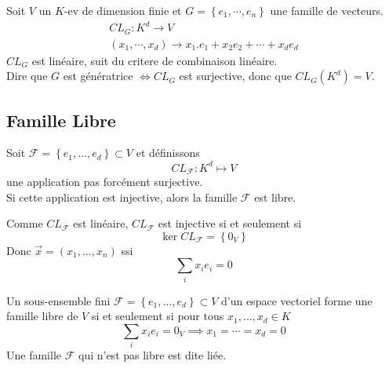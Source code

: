 \documentclass[../main.tex]{subfiles}
\begin{document}
Soit $V$ un $K$-ev de dimension finie et $G= \left\{ e_1, \cdots, e_n \right\} $ une famille de vecteurs.
\begin{align*}
CL_G: K ^{d} \to V\\
( x_1, \cdots, x_d)  \to x_1.e_1+x_2e_2+\cdots + x_d e_d
\end{align*}
$CL_G$ est linéaire, suit du critere de combinaison linéaire.\\
Dire que $G$ est génératrice $\iff CL_G$  est surjective, donc que $CL_G ( K^{d}) = V$.
\subsection{Famille Libre}
\begin{defn}
	Soit $ \mathcal{F}= \left\{ e_1, \ldots, e_d \right\} \subset V $ et définissons
	\[ 
	CL_{ \mathcal{F}} : K^{d} \mapsto V
	\]
	une application pas forcément surjective.\\
	Si cette application est injective, alors la famille $ \mathcal{F}$ est libre.
\end{defn}
Comme $CL_{\mathcal{F}} $ est linéaire, $CL_{\mathcal{F}} $ est injective si et seulement si
\[ 
\ker CL_{\mathcal{F}} = \left\{ 0_V \right\} 
\]
Donc $\vec{x} = \left( x_1, \ldots, x_n\right) $ ssi
\[ 
\sum_i x_i e_i = 0
\]
\begin{defn}
	Un sous-ensemble fini $\mathcal{F} = \left\{ e_1, \ldots, e_d \right\} \subset V$ d'un espace vectoriel forme une famille libre de $V$ si et seulement si pour tous $x_1, \ldots, x_d \in K$ 
	\[ 
	\sum_i x_i e_i = 0_V \implies x_1= \cdots = x_d = 0
	\]
	Une famille $\mathcal{F}$ qui n'est pas libre est dite liée.
\end{defn}
\end{document}
